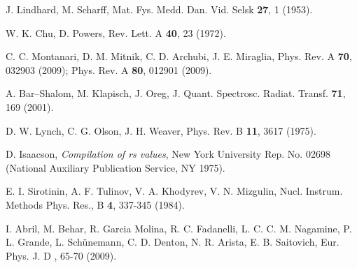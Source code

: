 \begin{thebibliography}{9}
J. Lindhard, M. Scharff,  
Mat. Fys. Medd. Dan. Vid. Selsk  \textbf{27}, 1 (1953).

W. K. Chu, D. Powers, 
Rev. Lett. A \textbf{40}, 23 (1972).

C. C. Montanari, D. M. Mitnik, C. D. Archubi, J. E. Miraglia, 
Phys. Rev. A \textbf{70}, 032903 (2009); 
Phys. Rev. A \textbf{80}, 012901 (2009).

\begin{comment}

\bibitem{Montanari:09}
C. C. Montanari, C. D. Archubi, D. M. Mitnik, J. E. Miraglia,
Phys. Rev. A \textbf{79}, 032903 (2009);

\bibitem{Montanari:11}
C.C. Montanari, D. M. Mitnik, J. E. Miraglia,
Rad. Eff. Defects Sol. \textbf{166}, 338 (2011).

\bibitem{Oswald:18}
M. Oswal, Sunil Kumar, Udai Singh, G. Singhe, K. P. Singh, D. Mehta,
D. Mitnik, C. C. Montanari, T.Nandi,
Nucl. Instrum. Methods Phys. Res., B \textbf{416}, 110 (2018).

\bibitem{Montanari:19}
A. M. P. Mendez, C. C. Montanari, D. M. Mitnik, J. E. Miraglia,
\textit{en preparación}.

\end{comment}


A. Bar--Shalom, M. Klapisch, J. Oreg,
J. Quant. Spectrosc. Radiat. Transf. \textbf{71}, 169 (2001).

D. W. Lynch, C. G. Olson, J. H. Weaver,
Phys. Rev. B \textbf{11}, 3617 (1975).

D. Isaacson,
\textit{Compilation of rs values}, New York University Rep. No. 02698
(National Auxiliary Publication Service, NY 1975).


E. I. Sirotinin, A. F. Tulinov, V. A. Khodyrev, V. N. Mizgulin, 
Nucl. Instrum. Methods Phys. Res., B \textbf{4}, 337-345 (1984).

I. Abril, M. Behar, R. Garcia Molina, R. C. Fadanelli, L. C. C. M. Nagamine, 
P. L. Grande, L. Sch\"unemann, C. D. Denton, N. R. Arista, E. B. Saitovich,
Eur. Phys. J. D , 65-70 (2009).


\end{thebibliography}
